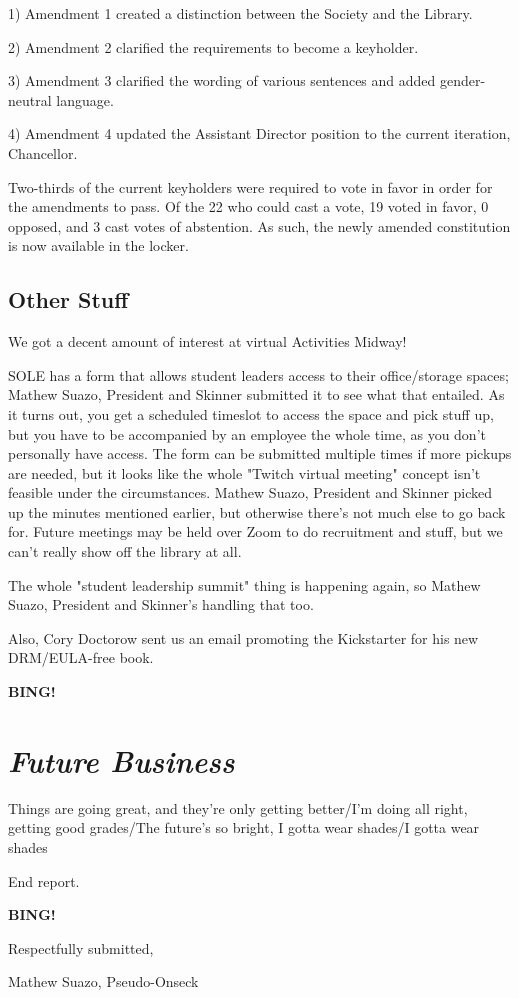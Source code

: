 \documentclass[10pt]{article}
\newcommand{\bing}{{\bf BING!} }
\newcommand{\goto}[1]{\bing \vskip 12pt \section*{{\em{#1}}}}
\newcommand{\skinner}{Mathew Suazo, President and Skinner\xspace}
\newcommand{\onseck}{Mathew Suazo, Pseudo-Onseck\xspace}
\begin{document}
1) Amendment 1 created a distinction between the Society and the Library.

2) Amendment 2 clarified the requirements to become a keyholder.

3) Amendment 3 clarified the wording of various sentences and added gender-neutral language.

4) Amendment 4 updated the Assistant Director position to the current iteration, Chancellor.

Two-thirds of the current keyholders were required to vote in favor in order for the amendments to pass. Of the 22 who could cast a vote, 19 voted in favor, 0 opposed, and 3 cast votes of abstention. As such, the newly amended constitution is now available in the locker.

\subsection*{Other Stuff}

We got a decent amount of interest at virtual Activities Midway!

SOLE has a form that allows student leaders access to their office/storage spaces; \skinner submitted it to see what that entailed. As it turns out, you get a scheduled timeslot to access the space and pick stuff up, but you have to be accompanied by an employee the whole time, as you don't personally have access. The form can be submitted multiple times if more pickups are needed, but it looks like the whole "Twitch virtual meeting" concept isn't feasible under the circumstances. \skinner picked up the minutes mentioned earlier, but otherwise there's not much else to go back for. Future meetings may be held over Zoom to do recruitment and stuff, but we can't really show off the library at all.

The whole "student leadership summit" thing is happening again, so \skinner's handling that too.

Also, Cory Doctorow sent us an email promoting the Kickstarter for his new DRM/EULA-free book.

\goto{Future Business}

Things are going great, and they're only getting better/I'm doing all right, getting good grades/The future's so bright, I gotta wear shades/I gotta wear shades

\noindent
End report.

\bing
\vspace{18pt}

\centerline{Respectfully submitted,}
\centerline{\onseck}
\end{document}
